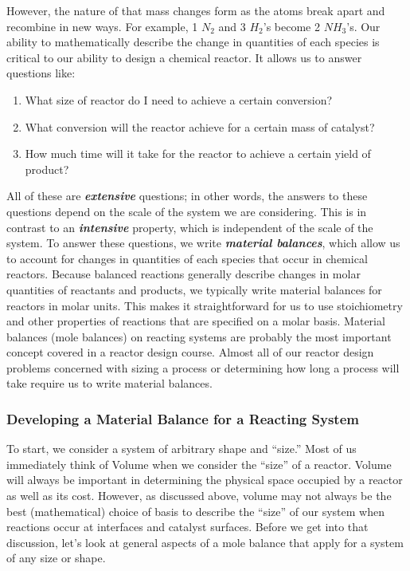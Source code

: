 \documentclass[11pt]{article}
\providecommand{\tightlist}{%
      \setlength{\itemsep}{0pt}\setlength{\parskip}{0pt}}
\begin{document}
However, the nature of that mass changes form as the atoms break apart
and recombine in new ways. For example, 1 \(N_2\) and 3 \(H_2\)'s become
2 \(N\!H_3\)'s. Our ability to mathematically describe the change in
quantities of each species is critical to our ability to design a
chemical reactor. It allows us to answer questions like:

\begin{enumerate}
\def\labelenumi{\arabic{enumi}.}
\tightlist
\item
  What size of reactor do I need to achieve a certain conversion?
\item
  What conversion will the reactor achieve for a certain mass of
  catalyst?
\item
  How much time will it take for the reactor to achieve a certain yield
  of product?
\end{enumerate}

All of these are \textbf{\emph{extensive}} questions; in other words,
the answers to these questions depend on the scale of the system we are
considering. This is in contrast to an \textbf{\emph{intensive}}
property, which is independent of the scale of the system. To answer
these questions, we write \textbf{\emph{material balances}}, which allow
us to account for changes in quantities of each species that occur in
chemical reactors. Because balanced reactions generally describe changes
in molar quantities of reactants and products, we typically write
material balances for reactors in molar units. This makes it
straightforward for us to use stoichiometry and other properties of
reactions that are specified on a molar basis. Material balances (mole
balances) on reacting systems are probably the most important concept
covered in a reactor design course. Almost all of our reactor design
problems concerned with sizing a process or determining how long a
process will take require us to write material balances.

\hypertarget{developing-a-material-balance-for-a-reacting-system}{%
\subsubsection{Developing a Material Balance for a Reacting
System}\label{developing-a-material-balance-for-a-reacting-system}}

To start, we consider a system of arbitrary shape and ``size.'' Most of
us immediately think of Volume when we consider the ``size'' of a
reactor. Volume will always be important in determining the physical
space occupied by a reactor as well as its cost. However, as discussed
above, volume may not always be the best (mathematical) choice of basis
to describe the ``size'' of our system when reactions occur at
interfaces and catalyst surfaces. Before we get into that discussion,
let's look at general aspects of a mole balance that apply for a system
of any size or shape.
\end{document}
